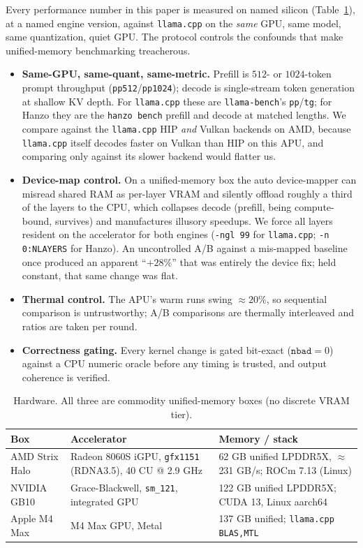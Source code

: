\documentclass[11pt]{article}
\begin{document}
Every performance number in this paper is measured on named silicon (Table~\ref{tab:hw}), at a named
engine version, against \texttt{llama.cpp} on the \emph{same} GPU, same model, same quantization, quiet GPU. The
protocol controls the confounds that make unified-memory benchmarking treacherous.

\begin{itemize}
  \item \textbf{Same-GPU, same-quant, same-metric.} Prefill is $512$- or $1024$-token prompt
  throughput (\texttt{pp512}/\texttt{pp1024}); decode is single-stream token generation at shallow KV
  depth. For \texttt{llama.cpp} these are \texttt{llama-bench}'s \texttt{pp}/\texttt{tg}; for Hanzo they
  are the \texttt{hanzo bench} prefill and decode at matched lengths. We compare against the
  \texttt{llama.cpp} HIP \emph{and} Vulkan backends on AMD, because \texttt{llama.cpp} itself decodes
  faster on Vulkan than HIP on this APU, and comparing only against its slower backend would flatter us.
  \item \textbf{Device-map control.} On a unified-memory box the auto device-mapper can misread shared
  RAM as per-layer VRAM and silently offload roughly a third of the layers to the CPU, which collapses
  decode (prefill, being compute-bound, survives) and manufactures illusory speedups. We force all
  layers resident on the accelerator for both engines (\texttt{-ngl 99} for \texttt{llama.cpp};
  \texttt{-n 0:NLAYERS} for Hanzo). An uncontrolled A/B against a mis-mapped baseline once produced an
  apparent ``$+28\%$'' that was entirely the device fix; held constant, that same change was flat.
  \item \textbf{Thermal control.} The APU's warm runs swing $\approx 20\%$, so sequential comparison is
  untrustworthy; A/B comparisons are thermally interleaved and ratios are taken per round.
  \item \textbf{Correctness gating.} Every kernel change is gated bit-exact ($\texttt{nbad}=0$) against
  a CPU numeric oracle before any timing is trusted, and output coherence is verified.
\end{itemize}

\begin{table}[t]
\centering
\caption{Hardware. All three are commodity unified-memory boxes (no discrete VRAM tier).}
\label{tab:hw}
\begin{tabular}{lll}
\toprule
\textbf{Box} & \textbf{Accelerator} & \textbf{Memory / stack} \\
\midrule
AMD Strix Halo & Radeon 8060S iGPU, \texttt{gfx1151} (RDNA3.5), 40 CU @ 2.9 GHz & 62 GB unified LPDDR5X, $\approx$231 GB/s; ROCm 7.13 (Linux) \\
NVIDIA GB10    & Grace-Blackwell, \texttt{sm\_121}, integrated GPU & 122 GB unified LPDDR5X; CUDA 13, Linux aarch64 \\
Apple M4 Max   & M4 Max GPU, Metal & 137 GB unified; \texttt{llama.cpp} \texttt{BLAS,MTL} \\
\bottomrule
\end{tabular}
\end{table}
\end{document}
